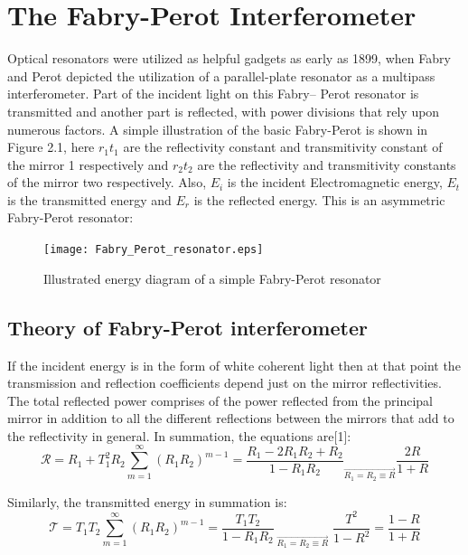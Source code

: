 \section{The Fabry-Perot Interferometer}
Optical resonators were utilized as helpful gadgets as early as 1899, when Fabry and Perot depicted the utilization of a parallel-plate resonator as a multipass interferometer. Part of the incident light on this Fabry– Perot resonator is transmitted and another part is reflected, with power divisions that rely upon numerous factors. A simple illustration of the basic Fabry-Perot is shown in Figure 2.1, here $r_{1} t_{1}$ are the reflectivity constant and transmitivity constant of the mirror 1 respectively and $r_{2} t_{2}$ are the reflectivity and transmitivity constants of the mirror two respectively. Also, $E_{i}$ is the incident Electromagnetic energy, $E_{t}$ is the transmitted energy and $E_{r}$ is the reflected energy. This is an asymmetric Fabry-Perot resonator:

\begin{figure}[h]
\centering
\texttt{[image: Fabry\_Perot\_resonator.eps]}
\caption{Illustrated energy diagram of a simple Fabry-Perot resonator}
\end{figure}

\newpage

\subsection{Theory of Fabry-Perot interferometer}
 If the incident energy is in the form of white coherent light then at that point the transmission and reflection coefficients depend just on the mirror reflectivities. The total reflected power comprises of the power reflected from the principal mirror in addition to all the different reflections between the mirrors that add to the reflectivity in general. In summation, the equations are[1]: 
\begin{equation}
{\mathcal R} = R_{1} + T_{1}^2 R_{2} \sum_{m=1}^{\infty} (R_{1}R_{2})^{m-1} = \frac{R_{1} - 2R_{1}R_{2} + R_{2}}{1 - R_{1}R_{2}} _{\overrightarrow{R_{1} = R_{2} \equiv R}} \frac{2R}{1+R}
\end{equation}

Similarly, the transmitted energy in summation is:
\begin{equation}
{\mathcal T} = T_{1} T_{2} \sum_{m=1}^{\infty} (R_{1}R_{2})^{m-1} = \frac{T_{1} T_{2}}{1 - R_{1}R_{2}} _{\; \overrightarrow{R_{1} = R_{2} \equiv R}} \; \frac{T^{2}}{1-R^{2}} = \frac{1-R}{1+R}
\end{equation}

